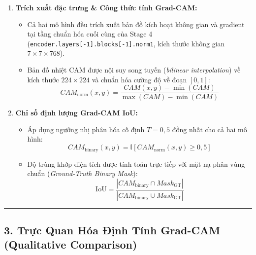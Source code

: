 \documentclass[
  11pt,
  a4paper,
]{article}
\providecommand{\tightlist}{%
  \setlength{\itemsep}{0pt}\setlength{\parskip}{0pt}}
\begin{document}
\begin{enumerate}
  \begin{itemize}
  \tightlist
  \item
    Mỗi phân lớp chọn \textbf{1 mẫu True-Positive (TP)} đại diện
    (\(\text{Ground Truth} = \text{Prediction}_{\text{Baseline}} = \text{Prediction}_{\text{Proposed}} = \text{Fine Class}\)).
  \item
    Các mẫu thuộc các lớp tổn thương phổ biến được trích xuất hoàn toàn
    từ \textbf{tập Test độc lập 100\% bệnh nhân của Split 0}.
  \end{itemize}
\item
  \textbf{Trích xuất đặc trưng \& Công thức tính Grad-CAM:}

  \begin{itemize}
  \tightlist
  \item
    Cả hai mô hình đều trích xuất bản đồ kích hoạt không gian và
    gradient tại tầng chuẩn hóa cuối cùng của Stage 4
    (\texttt{encoder.layers{[}-1{]}.blocks{[}-1{]}.norm1}, kích thước
    không gian \(7 \times 7 \times 768\)).
  \item
    Bản đồ nhiệt CAM được nội suy song tuyến (\emph{bilinear
    interpolation}) về kích thước \(224 \times 224\) và chuẩn hóa cường
    độ về đoạn \([0, 1]\):
    \[CAM_{\text{norm}}(x, y) = \frac{CAM(x,y) - \min(CAM)}{\max(CAM) - \min(CAM)}\]
  \end{itemize}
\item
  \textbf{Chỉ số định lượng Grad-CAM IoU:}

  \begin{itemize}
  \tightlist
  \item
    Áp dụng ngưỡng nhị phân hóa cố định \(T = 0{,}5\) đồng nhất cho cả
    hai mô hình:
    \[CAM_{\text{binary}}(x, y) = \mathbb{I}\left[CAM_{\text{norm}}(x, y) \ge 0{,}5\right]\]
  \item
    Độ trùng khớp diện tích được tính toán trực tiếp với mặt nạ phân
    vùng chuẩn (\emph{Ground-Truth Binary Mask}):
    \[\text{IoU} = \frac{|CAM_{\text{binary}} \cap Mask_{\text{GT}}|}{|CAM_{\text{binary}} \cup Mask_{\text{GT}}|}\]
  \end{itemize}
\end{enumerate}

\begin{center}\rule{0.5\linewidth}{0.5pt}\end{center}

\subsection{3. Trực Quan Hóa Định Tính Grad-CAM (Qualitative
Comparison)}\label{trux1ef1c-quan-huxf3a-ux111ux1ecbnh-tuxednh-grad-cam-qualitative-comparison}
\end{document}
